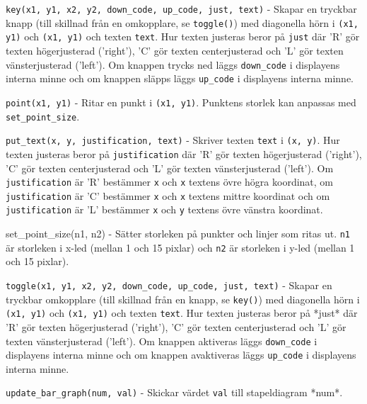 \texttt{key(x1, y1, x2, y2, down\_code, up\_code, just, text)} - Skapar en
tryckbar knapp (till skillnad från en omkopplare, se \texttt{toggle()}) med
diagonella hörn i \texttt{(x1, y1)} och \texttt{(x1, y1)} och texten \texttt{text}. Hur
texten justeras beror på \texttt{just} där 'R' gör texten högerjusterad ('right'), 'C'
gör texten centerjusterad och 'L' gör texten vänsterjusterad ('left'). Om
knappen trycks ned läggs \texttt{down\_code} i displayens interna minne och om knappen
släpps läggs \texttt{up\_code} i displayens interna minne.

\texttt{point(x1, y1)} - Ritar en punkt i \texttt{(x1, y1)}. Punktens storlek kan
anpassas med \texttt{set\_point\_size}.

\texttt{put\_text(x, y, justification, text)} - Skriver texten \texttt{text} i
\texttt{(x, y)}. Hur texten justeras beror på \texttt{justification} där 'R' gör
texten högerjusterad ('right'), 'C' gör texten centerjusterad och 'L' gör texten
vänsterjusterad ('left'). Om \texttt{justification} är 'R' bestämmer \texttt{x}
och \texttt{x} textens övre högra koordinat, om \texttt{justification} är 'C'
bestämmer \texttt{x} och \texttt{x} textens mittre koordinat och om
\texttt{justification} är 'L' bestämmer \texttt{x} och \texttt{y} textens övre
vänstra koordinat.

set\_point\_size(n1, n2) - Sätter storleken på punkter och linjer som ritas ut.
\texttt{n1} är storleken i x-led (mellan 1 och 15 pixlar) och \texttt{n2} är
storleken i y-led (mellan 1 och 15 pixlar).

\texttt{toggle(x1, y1, x2, y2, down\_code, up\_code, just, text)} - Skapar en
tryckbar omkopplare (till skillnad från en knapp, se \texttt{key()}) med
diagonella hörn i \texttt{(x1, y1)} och \texttt{(x1, y1)} och texten
\texttt{text}. Hur texten justeras beror på *just* där 'R' gör texten
högerjusterad ('right'), 'C' gör texten centerjusterad och 'L' gör texten
vänsterjusterad ('left'). Om knappen aktiveras läggs \texttt{down\_code} i
displayens interna minne och om knappen avaktiveras läggs \texttt{up\_code} i
displayens interna minne.

\texttt{update\_bar\_graph(num, val)} - Skickar värdet \texttt{val} till
stapeldiagram *num*.
